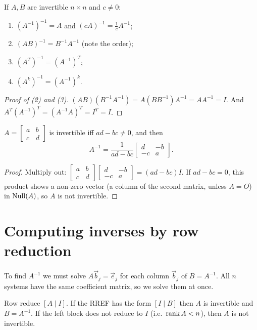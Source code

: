 \begin{theorem}[Properties]
If $A,B$ are invertible $n\times n$ and $c\neq 0$:
\begin{enumerate}
  \item $(A^{-1})^{-1}=A$ and $(cA)^{-1}=\frac1cA^{-1}$;
  \item $(AB)^{-1}=B^{-1}A^{-1}$ (note the order);
  \item $(A^T)^{-1}=(A^{-1})^T$;
  \item $(A^k)^{-1}=(A^{-1})^k$.
\end{enumerate}
\end{theorem}
\begin{proof}[Proof of (2) and (3)]
$(AB)(B^{-1}A^{-1})=A(BB^{-1})A^{-1}=AA^{-1}=I$. And $A^T(A^{-1})^T=(A^{-1}A)^T=I^T=I$.
\end{proof}

\begin{theorem}
$A=\begin{bmatrix}a&b\\c&d\end{bmatrix}$ is invertible iff $ad-bc\ne0$, and then
\[
  A^{-1}=\frac{1}{ad-bc}\begin{bmatrix}d&-b\\-c&a\end{bmatrix}.
\]
\end{theorem}
\begin{proof}
Multiply out: $\begin{bmatrix}a&b\\c&d\end{bmatrix}\begin{bmatrix}d&-b\\-c&a\end{bmatrix}=(ad-bc)I$.
If $ad-bc=0$, this product shows a non-zero vector (a column of the second matrix, unless
$A=O$) in $\operatorname{Null}(A)$, so $A$ is not invertible.
\end{proof}

\section{Computing inverses by row reduction}

To find $A^{-1}$ we must solve $A\vec b_j=\vec e_j$ for each column $\vec b_j$ of $B=A^{-1}$. All
$n$ systems have the same coefficient matrix, so we solve them at once.

\begin{important}
Row reduce $[A\mid I]$. If the RREF has the form $[I\mid B]$ then $A$ is invertible and
$B=A^{-1}$. If the left block does not reduce to $I$ (i.e.\ $\operatorname{rank} A<n$), then $A$ is not invertible.
\end{important}

